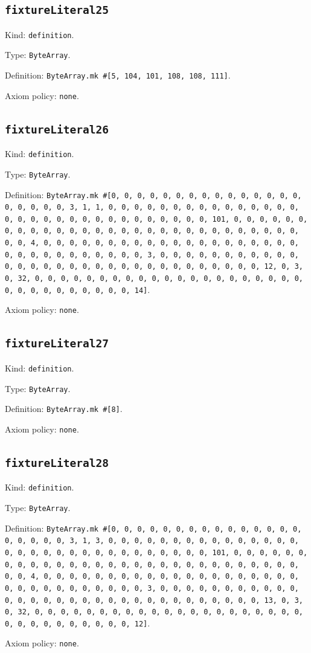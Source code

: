 \documentclass[11pt]{article}
\begin{document}
\subsection*{\texttt{fixtureLiteral25}}
\noindent Kind: \texttt{definition}.\par
\noindent Type: \texttt{ByteArray}.\par
\noindent Definition: \texttt{ByteArray.mk \#[5, 104, 101, 108, 108, 111]}.\par
\noindent Axiom policy: \texttt{none}.\par
\subsection*{\texttt{fixtureLiteral26}}
\noindent Kind: \texttt{definition}.\par
\noindent Type: \texttt{ByteArray}.\par
\noindent Definition: \texttt{ByteArray.mk \#[0, 0, 0, 0, 0, 0, 0, 0, 0, 0, 0, 0, 0, 0, 0, 0, 0, 0, 0, 0, 3, 1, 1, 0, 0, 0, 0, 0, 0, 0, 0, 0, 0, 0, 0, 0, 0, 0, 0, 0, 0, 0, 0, 0, 0, 0, 0, 0, 0, 0, 0, 0, 0, 0, 101, 0, 0, 0, 0, 0, 0, 0, 0, 0, 0, 0, 0, 0, 0, 0, 0, 0, 0, 0, 0, 0, 0, 0, 0, 0, 0, 0, 0, 0, 0, 0, 4, 0, 0, 0, 0, 0, 0, 0, 0, 0, 0, 0, 0, 0, 0, 0, 0, 0, 0, 0, 0, 0, 0, 0, 0, 0, 0, 0, 0, 0, 0, 0, 3, 0, 0, 0, 0, 0, 0, 0, 0, 0, 0, 0, 0, 0, 0, 0, 0, 0, 0, 0, 0, 0, 0, 0, 0, 0, 0, 0, 0, 0, 0, 0, 12, 0, 3, 0, 32, 0, 0, 0, 0, 0, 0, 0, 0, 0, 0, 0, 0, 0, 0, 0, 0, 0, 0, 0, 0, 0, 0, 0, 0, 0, 0, 0, 0, 0, 0, 0, 14]}.\par
\noindent Axiom policy: \texttt{none}.\par
\subsection*{\texttt{fixtureLiteral27}}
\noindent Kind: \texttt{definition}.\par
\noindent Type: \texttt{ByteArray}.\par
\noindent Definition: \texttt{ByteArray.mk \#[8]}.\par
\noindent Axiom policy: \texttt{none}.\par
\subsection*{\texttt{fixtureLiteral28}}
\noindent Kind: \texttt{definition}.\par
\noindent Type: \texttt{ByteArray}.\par
\noindent Definition: \texttt{ByteArray.mk \#[0, 0, 0, 0, 0, 0, 0, 0, 0, 0, 0, 0, 0, 0, 0, 0, 0, 0, 0, 0, 3, 1, 3, 0, 0, 0, 0, 0, 0, 0, 0, 0, 0, 0, 0, 0, 0, 0, 0, 0, 0, 0, 0, 0, 0, 0, 0, 0, 0, 0, 0, 0, 0, 0, 101, 0, 0, 0, 0, 0, 0, 0, 0, 0, 0, 0, 0, 0, 0, 0, 0, 0, 0, 0, 0, 0, 0, 0, 0, 0, 0, 0, 0, 0, 0, 0, 4, 0, 0, 0, 0, 0, 0, 0, 0, 0, 0, 0, 0, 0, 0, 0, 0, 0, 0, 0, 0, 0, 0, 0, 0, 0, 0, 0, 0, 0, 0, 0, 3, 0, 0, 0, 0, 0, 0, 0, 0, 0, 0, 0, 0, 0, 0, 0, 0, 0, 0, 0, 0, 0, 0, 0, 0, 0, 0, 0, 0, 0, 0, 0, 13, 0, 3, 0, 32, 0, 0, 0, 0, 0, 0, 0, 0, 0, 0, 0, 0, 0, 0, 0, 0, 0, 0, 0, 0, 0, 0, 0, 0, 0, 0, 0, 0, 0, 0, 0, 12]}.\par
\noindent Axiom policy: \texttt{none}.\par
\end{document}
